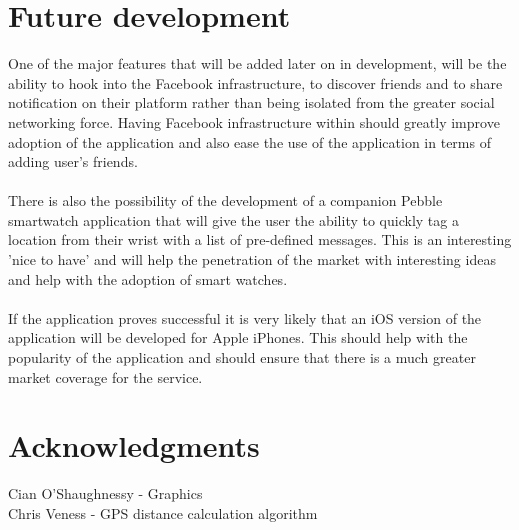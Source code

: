 \documentclass[a0,landscape]{a0poster}
\begin{document}
\begin{multicols}{5}
\color{RosyBrown}
\section{Future development}

One of the major features that will be added later on in development, will be the ability to hook into the Facebook infrastructure, to discover friends and to share notification on their platform rather than being isolated from the greater social networking force. Having Facebook infrastructure within should greatly improve adoption of the application and also ease the use of the application in terms of adding user's friends.\\
\\
There is also the possibility of the development of a companion Pebble smartwatch application that will give the user the ability to quickly tag a location from their wrist with a list of pre-defined messages. This is an interesting 'nice to have' and will help the penetration of the market with interesting ideas and help with the adoption of smart watches.\\
\\
If the application proves successful it is very likely that an iOS version of the application will be developed for Apple iPhones. This should help with the popularity of the application and should ensure that there is a much greater market coverage for the service.

\color{DeepSkyBlue}
\section{Acknowledgments}

Cian O'Shaughnessy - Graphics\\
Chris Veness - GPS distance calculation algorithm\\


\end{multicols}
\end{document}
